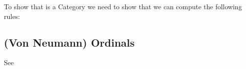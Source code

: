 \documentclass[a4paper,openany]{amsbook}
\begin{document}
To show that \Universe{}{} is a Category we need to show that we can compute the following 
rules:

\begin{prooftree}
\end{prooftree}

\begin{prooftree}
\end{prooftree}

\begin{prooftree}
\end{prooftree}

\begin{prooftree}
\end{prooftree}

\begin{prooftree}
\end{prooftree}

\subsection{(Von Neumann) Ordinals}

See \cite{joyalMoerdijk1995algSetTh, aczel1988nonWellFoundedSets}
\end{document}
